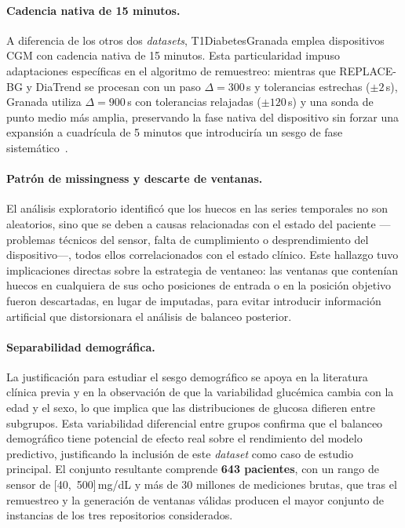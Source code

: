 \paragraph{Cadencia nativa de 15 minutos.} A diferencia de los otros dos \textit{datasets}, T1DiabetesGranada emplea dispositivos CGM con cadencia nativa de 15 minutos. Esta particularidad impuso adaptaciones específicas en el algoritmo de remuestreo: mientras que REPLACE-BG y DiaTrend se procesan con un paso $\Delta = 300$\,s y tolerancias estrechas ($\pm 2$\,s), Granada utiliza $\Delta = 900$\,s con tolerancias relajadas ($\pm 120$\,s) y una sonda de punto medio más amplia, preservando la fase nativa del dispositivo sin forzar una expansión a cuadrícula de 5 minutos que introduciría un sesgo de fase sistemático~\cite{antoniotfg}.
\paragraph{Patrón de missingness y descarte de ventanas.} El análisis exploratorio identificó que los huecos en las series temporales no son aleatorios, sino que se deben a causas relacionadas con el estado del paciente ---problemas técnicos del sensor, falta de cumplimiento o desprendimiento del dispositivo---, todos ellos correlacionados con el estado clínico. Este hallazgo tuvo implicaciones directas sobre la estrategia de ventaneo: las ventanas que contenían huecos en cualquiera de sus ocho posiciones de entrada o en la posición objetivo fueron descartadas, en lugar de imputadas, para evitar introducir información artificial que distorsionara el análisis de balanceo posterior.
\paragraph{Separabilidad demográfica.} La justificación para estudiar el sesgo demográfico se apoya en la literatura clínica previa y en la observación de que la variabilidad glucémica cambia con la edad y el sexo, lo que implica que las distribuciones de glucosa difieren entre subgrupos. Esta variabilidad diferencial entre grupos confirma que el balanceo demográfico tiene potencial de efecto real sobre el rendimiento del modelo predictivo, justificando la inclusión de este \textit{dataset} como caso de estudio principal.
El conjunto resultante comprende \textbf{643 pacientes}, con un rango de sensor de [40,~500]\,mg/dL y más de 30 millones de mediciones brutas, que tras el remuestreo y la generación de ventanas válidas producen el mayor conjunto de instancias de los tres repositorios considerados.


